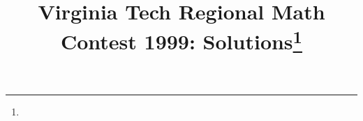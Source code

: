 \documentclass[10pt]{article}
\begin{document}
\title{Virginia Tech Regional Math Contest 1999: Solutions\footnote{\disclaimer}}
\author{\vspace{-2ex}}
\date{\vspace{-5ex}} %
\maketitle

%

%

%

%

%

%
\end{document}
